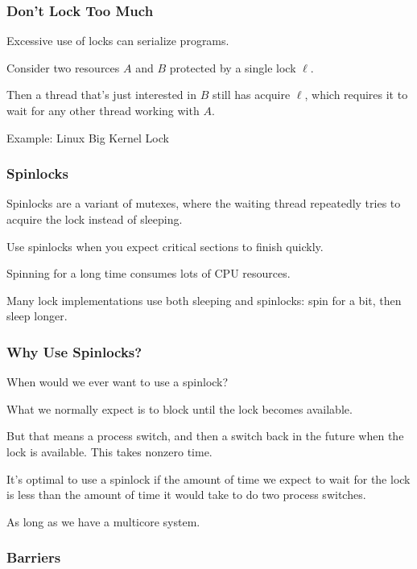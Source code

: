\begin{frame}
\frametitle{Don't Lock Too Much}

Excessive use of locks can serialize programs. 

Consider two resources
$A$ and $B$ protected by a single lock $\ell$. 

Then a thread that's
just interested in $B$ still has acquire $\ell$, which requires it to
wait for any other thread working with $A$.

Example: Linux Big Kernel Lock

\end{frame}



\begin{frame}
\frametitle{Spinlocks}

Spinlocks are a variant of mutexes, where the
waiting thread repeatedly tries to acquire the lock instead of sleeping.

Use spinlocks when you expect critical sections to finish 
quickly.

Spinning
for a long time consumes lots of CPU resources.

 Many lock
implementations use both sleeping and spinlocks: spin for a bit,
then sleep longer.


\end{frame}



\begin{frame}
\frametitle{Why Use Spinlocks?}

When would we ever want to use a spinlock?

What we normally expect is to block until the lock becomes available. 

But that means a process switch, and then a switch back in the future when the lock is available.  This takes nonzero time. 

It's optimal to use a spinlock if the amount of time we expect to wait for the lock is less than the amount of time it would take to do two process switches. 

As long as we have a multicore system.

\end{frame}

\begin{frame}
  \frametitle{Barriers}

  \begin{center}
    
  \end{center}

\end{frame}

